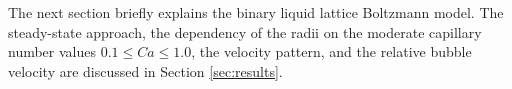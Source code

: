 \documentclass{article}
\begin{document}


The next section briefly explains the binary liquid lattice Boltzmann model.
The steady-state approach, the dependency of the radii on the moderate capillary number values
$0.1\leq Ca \leq 1.0$, the velocity pattern, and the relative bubble velocity are discussed in Section
\ref{sec:results}. 
\end{document}
